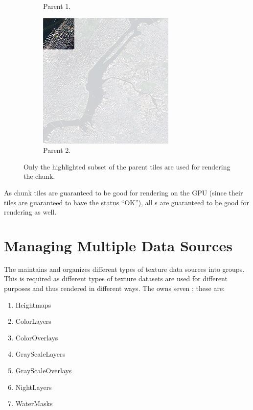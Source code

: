 \begin{figure}[htbp]
\begin{subfigure}[t]{0.3\textwidth}
        \caption{Parent 1.}
    \end{subfigure}
    \quad
    \begin{subfigure}[t]{0.3\textwidth}
        \includegraphics[width=\textwidth]{figures/implementation/chunktile/chunktilepile1.png}
        \caption{Parent 2.}
    \end{subfigure}
    \caption{Only the highlighted subset of the parent tiles are used for rendering the chunk.}
    \label{fig:chunktilepile}
\end{figure}

As chunk tiles are guaranteed to be good for rendering on the GPU (since their tiles are guaranteed to have the status ``OK''), all s are guaranteed to be good for rendering as well. 

\section{Managing Multiple Data Sources}
The  maintains and organizes different types of texture data sources into groups. This is required as different types of texture datasets are used for different purposes and thus rendered in different ways. The  owns seven ; these are:

\begin{enumerate}
\item Heightmaps
\item ColorLayers
\item ColorOverlays
\item GrayScaleLayers
\item GrayScaleOverlays
\item NightLayers
\item WaterMasks
\end{enumerate}

